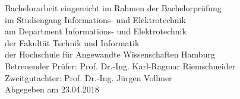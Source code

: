 \begin{titlepage}
 \begin{center}

{\scshape\Large \thetitle}

\vspace{1cm}

{\scshape\Large \theauthor}

\vspace{1cm}


\end{center}

\vfill

\noindent Bachelorarbeit eingereicht im Rahmen der Bachelorprüfung\\ 
im Studiengang Informations- und Elektrotechnik\\
am Department Informations- und Elektrotechnik\\
der Fakultät Technik und Informatik\\
der Hochschule für Angewandte Wissenschaften Hamburg\\

\vspace{0.5cm}
\noindent Betreuender Prüfer: Prof. Dr.-Ing. Karl-Ragmar Riemschneider\\
Zweitgutachter: Prof. Dr.-Ing. Jürgen Vollmer\\

\vspace{0.5cm}
\noindent Abgegeben am 23.04.2018

\addtocounter{page}{-1}

\end{titlepage}
 \restoregeometry
